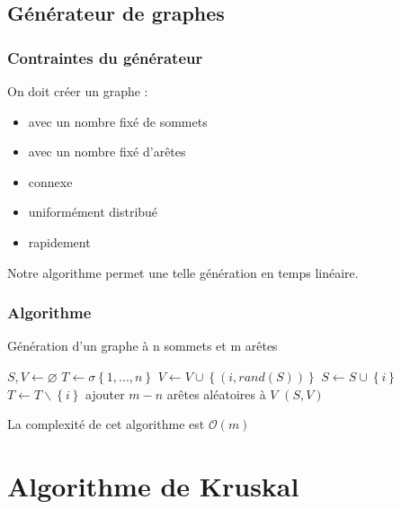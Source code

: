 \documentclass{beamer}
\begin{document}
		\subsection{Générateur de graphes}
			\begin{frame}
				\frametitle{Contraintes du générateur}
				On doit créer un graphe :
				\begin{itemize}
					\item avec un nombre fixé de sommets
					\item avec un nombre fixé d'arêtes
					\item connexe
					\item uniformément distribué
					\item rapidement
				\end{itemize}
				Notre algorithme permet une telle génération en temps linéaire.
			\end{frame}
			\begin{frame}
				\frametitle{Algorithme}
				
				\begin{algorithm}[H]
					\caption{Génération d'un graphe à n sommets
					et m arêtes}
					\begin{algorithmic}[H]
						\STATE $S,V \leftarrow \varnothing$
						\STATE $T \leftarrow \sigma\left\{1,...,n\right\}$
						\STATE $V \leftarrow V\cup\left\{(i,rand(S))\right\}$
						\STATE $S \leftarrow S\cup\left\{i\right\}$
						\STATE $T \leftarrow T\backslash\left\{i\right\}$
						\ENDFOR
						\STATE ajouter $m-n$ arêtes aléatoires à $V$
						\RETURN $(S,V)$
					\end{algorithmic}
				\end{algorithm}
				La complexité de cet algorithme est $\mathcal{O}(m)$
			\end{frame}

	\section{Algorithme de Kruskal}
	
\end{document}
